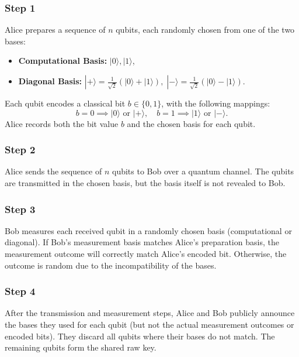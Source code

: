 \documentclass{article}
\begin{document}
\subsubsection*{Step 1}

Alice prepares a sequence of \( n \) qubits, each randomly chosen from one of the two bases:
\begin{itemize}
    \item \textbf{Computational Basis:} \( |0\rangle, |1\rangle \),
    \item \textbf{Diagonal Basis:} \( |+\rangle = \frac{1}{\sqrt{2}}(|0\rangle + |1\rangle), \; |-\rangle = \frac{1}{\sqrt{2}}(|0\rangle - |1\rangle). \)
\end{itemize}
Each qubit encodes a classical bit \( b \in \{0, 1\} \), with the following mappings:
\[
b = 0 \implies |0\rangle \text{ or } |+\rangle, \quad b = 1 \implies |1\rangle \text{ or } |-\rangle.
\]
Alice records both the bit value \( b \) and the chosen basis for each qubit.

\subsubsection*{Step 2}

Alice sends the sequence of \( n \) qubits to Bob over a quantum channel. The qubits are transmitted in the chosen basis, but the basis itself is not revealed to Bob.

\subsubsection*{Step 3}

Bob measures each received qubit in a randomly chosen basis (computational or diagonal). If Bob's measurement basis matches Alice's preparation basis, the measurement outcome will correctly match Alice's encoded bit. Otherwise, the outcome is random due to the incompatibility of the bases.

\subsubsection*{Step 4}

After the transmission and measurement steps, Alice and Bob publicly announce the bases they used for each qubit (but not the actual measurement outcomes or encoded bits). They discard all qubits where their bases do not match. The remaining qubits form the shared raw key.
\end{document}
